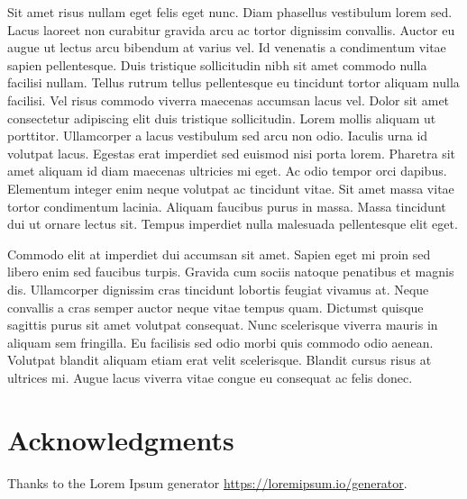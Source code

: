 \documentclass{rust-edu-workshop}
\begin{document}
  Sit amet risus nullam eget felis eget nunc. Diam phasellus
  vestibulum lorem sed. Lacus laoreet non curabitur gravida
  arcu ac tortor dignissim convallis. Auctor eu augue ut
  lectus arcu bibendum at varius vel. Id venenatis a
  condimentum vitae sapien pellentesque. Duis tristique
  sollicitudin nibh sit amet commodo nulla facilisi
  nullam. Tellus rutrum tellus pellentesque eu tincidunt
  tortor aliquam nulla facilisi. Vel risus commodo viverra
  maecenas accumsan lacus vel. Dolor sit amet consectetur
  adipiscing elit duis tristique sollicitudin. Lorem mollis
  aliquam ut porttitor. Ullamcorper a lacus vestibulum sed
  arcu non odio. Iaculis urna id volutpat lacus. Egestas
  erat imperdiet sed euismod nisi porta lorem. Pharetra sit
  amet aliquam id diam maecenas ultricies mi eget. Ac odio
  tempor orci dapibus. Elementum integer enim neque volutpat
  ac tincidunt vitae. Sit amet massa vitae tortor
  condimentum lacinia. Aliquam faucibus purus in
  massa. Massa tincidunt dui ut ornare lectus sit. Tempus
  imperdiet nulla malesuada pellentesque elit eget.

  Commodo elit at imperdiet dui accumsan sit amet. Sapien
  eget mi proin sed libero enim sed faucibus turpis. Gravida
  cum sociis natoque penatibus et magnis dis. Ullamcorper
  dignissim cras tincidunt lobortis feugiat vivamus
  at. Neque convallis a cras semper auctor neque vitae
  tempus quam. Dictumst quisque sagittis purus sit amet
  volutpat consequat. Nunc scelerisque viverra mauris in
  aliquam sem fringilla. Eu facilisis sed odio morbi quis
  commodo odio aenean. Volutpat blandit aliquam etiam erat
  velit scelerisque. Blandit cursus risus at ultrices
  mi. Augue lacus viverra vitae congue eu consequat ac felis
  donec.

\section*{Acknowledgments}

  Thanks to the Lorem Ipsum generator
  \url{https://loremipsum.io/generator}.



\end{document}
